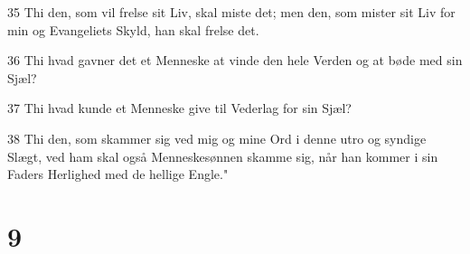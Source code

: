 \par 35 Thi den, som vil frelse sit Liv, skal miste det; men den, som mister sit Liv for min og Evangeliets Skyld, han skal frelse det.
\par 36 Thi hvad gavner det et Menneske at vinde den hele Verden og at bøde med sin Sjæl?
\par 37 Thi hvad kunde et Menneske give til Vederlag for sin Sjæl?
\par 38 Thi den, som skammer sig ved mig og mine Ord i denne utro og syndige Slægt, ved ham skal også Menneskesønnen skamme sig, når han kommer i sin Faders Herlighed med de hellige Engle."

\chapter{9}

